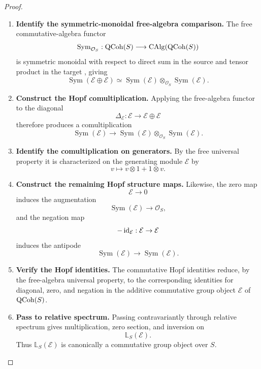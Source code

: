\begin{proof}
\leavevmode
\begin{enumerate}[label=\textup{(\arabic*)}]
    \item \textbf{Identify the symmetric-monoidal free-algebra comparison.}
The free commutative-algebra functor
\[
  \operatorname{Sym}_{\mathcal O_S}:
  \operatorname{QCoh}(S)\longrightarrow\operatorname{CAlg}(\operatorname{QCoh}(S))
\]
is symmetric monoidal with respect to direct sum in the source and tensor
product in the target \cite{LurieHigherAlgebra}, giving
\[
  \operatorname{Sym}(\mathcal E\oplus \mathcal E)
  \simeq
  \operatorname{Sym}(\mathcal E)\otimes_{\mathcal O_S}\operatorname{Sym}(\mathcal E).
\]

    \item \textbf{Construct the Hopf comultiplication.}
Applying the free-algebra functor to the diagonal
\[
  \Delta_{\mathcal E}:\mathcal E\to \mathcal E\oplus \mathcal E
\]
therefore produces a comultiplication
\[
  \operatorname{Sym}(\mathcal E)
  \longrightarrow
  \operatorname{Sym}(\mathcal E)\otimes_{\mathcal O_S}\operatorname{Sym}(\mathcal E).
\]

    \item \textbf{Identify the comultiplication on generators.}
By the free universal property it is characterized on the generating module
\(\mathcal E\) by
\[
  v\longmapsto v\otimes1+1\otimes v.
\]

    \item \textbf{Construct the remaining Hopf structure maps.}
Likewise, the zero map
\[
  \mathcal E\to0
\]
induces the augmentation
\[
  \operatorname{Sym}(\mathcal E)\longrightarrow\mathcal O_S,
\]
and the negation map
\[
  -\operatorname{id}_{\mathcal E}:\mathcal E\to \mathcal E
\]
induces the antipode
\[
  \operatorname{Sym}(\mathcal E)\longrightarrow\operatorname{Sym}(\mathcal E).
\]

    \item \textbf{Verify the Hopf identities.}
The commutative Hopf identities reduce, by the free-algebra universal property,
to the corresponding identities for diagonal, zero, and negation in the
additive commutative group object \(\mathcal E\) of \(\operatorname{QCoh}(S)\).

    \item \textbf{Pass to relative spectrum.}
Passing contravariantly through relative spectrum gives multiplication, zero
section, and inversion on
\[
  \mathbb L_S(\mathcal E).
\]
Thus \(\mathbb L_S(\mathcal E)\) is canonically a commutative group object over \(S\).


\end{enumerate}
\end{proof}
